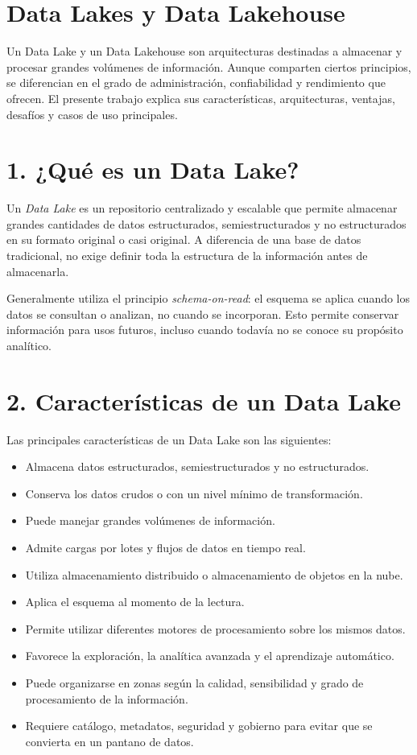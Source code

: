 \section*{Data Lakes y Data Lakehouse}

Un Data Lake y un Data Lakehouse son arquitecturas destinadas a almacenar y
procesar grandes volúmenes de información. Aunque comparten ciertos principios,
se diferencian en el grado de administración, confiabilidad y rendimiento que
ofrecen. El presente trabajo explica sus características, arquitecturas,
ventajas, desafíos y casos de uso principales.

\section*{1. ¿Qué es un Data Lake?}

Un \textit{Data Lake} es un repositorio centralizado y escalable que permite
almacenar grandes cantidades de datos estructurados, semiestructurados y no
estructurados en su formato original o casi original. A diferencia de una base
de datos tradicional, no exige definir toda la estructura de la información
antes de almacenarla.

Generalmente utiliza el principio \textit{schema-on-read}: el esquema se aplica
cuando los datos se consultan o analizan, no cuando se incorporan. Esto permite
conservar información para usos futuros, incluso cuando todavía no se conoce su
propósito analítico.

\section*{2. Características de un Data Lake}

Las principales características de un Data Lake son las siguientes:

\begin{itemize}
    \item Almacena datos estructurados, semiestructurados y no estructurados.
    \item Conserva los datos crudos o con un nivel mínimo de transformación.
    \item Puede manejar grandes volúmenes de información.
    \item Admite cargas por lotes y flujos de datos en tiempo real.
    \item Utiliza almacenamiento distribuido o almacenamiento de objetos en la nube.
    \item Aplica el esquema al momento de la lectura.
    \item Permite utilizar diferentes motores de procesamiento sobre los mismos datos.
    \item Favorece la exploración, la analítica avanzada y el aprendizaje automático.
    \item Puede organizarse en zonas según la calidad, sensibilidad y grado de procesamiento de la información.
    \item Requiere catálogo, metadatos, seguridad y gobierno para evitar que se convierta en un pantano de datos.
\end{itemize}

